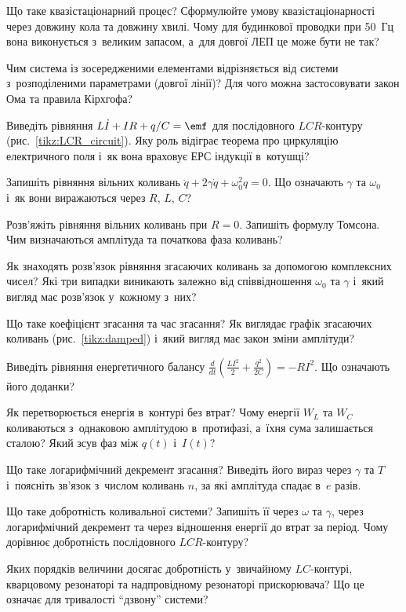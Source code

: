 \begin{Questions}
\begin{quizlist}
	\item Що таке квазістаціонарний процес? Сформулюйте умову квазістаціонарності через довжину кола та довжину хвилі. Чому для будинкової проводки при 50~Гц вона виконується з~великим запасом, а~для довгої ЛЕП це може бути не так?
	\item Чим система із зосередженими елементами відрізняється від системи з~розподіленими параметрами (довгої лінії)? Для чого можна застосовувати закон Ома та правила Кірхгофа?
	\item Виведіть рівняння $L\dot I + IR + q/C = \emf$ для послідовного $LCR$-контуру (рис.~\ref{tikz:LCR_circuit}). Яку роль відіграє теорема про циркуляцію електричного поля і~як вона враховує ЕРС індукції в~котушці?
	\item Запишіть рівняння вільних коливань $\ddot q + 2\gamma\dot q + \omega_0^2 q = 0$. Що означають $\gamma$ та $\omega_0$ і~як вони виражаються через $R$, $L$, $C$?
	\item Розв'яжіть рівняння вільних коливань при $R=0$. Запишіть формулу Томсона. Чим визначаються амплітуда та початкова фаза коливань?
	\item Як знаходять розв'язок рівняння згасаючих коливань за допомогою комплексних чисел? Які три випадки виникають залежно від співвідношення $\omega_0$ та $\gamma$ і~який вигляд має розв'язок у~кожному з~них?
	\item Що таке коефіцієнт згасання та час згасання? Як виглядає графік згасаючих коливань (рис.~\ref{tikz:damped}) і~який вигляд має закон зміни амплітуди?
	\item Виведіть рівняння енергетичного балансу $\frac{d}{dt}\left(\frac{LI^2}{2}+\frac{q^2}{2C}\right) = -RI^2$. Що означають його доданки?
	\item Як перетворюється енергія в~контурі без втрат? Чому енергії $W_L$ та $W_C$ коливаються з~однаковою амплітудою в~протифазі, а~їхня сума залишається сталою? Який зсув фаз між $q(t)$ і~$I(t)$?
	\item Що таке логарифмічний декремент згасання? Виведіть його вираз через $\gamma$ та $T$ і~поясніть зв'язок з~числом коливань $n$, за які амплітуда спадає в~$e$ разів.
	\item Що таке добротність коливальної системи? Запишіть її через $\omega$ та $\gamma$, через логарифмічний декремент та через відношення енергії до втрат за період. Чому дорівнює добротність послідовного $LCR$-контуру?
	\item Яких порядків величини досягає добротність у~звичайному $LC$-контурі, кварцовому резонаторі та надпровідному резонаторі прискорювача? Що це означає для тривалості \enquote{дзвону} системи?

\end{quizlist}
\end{Questions}
